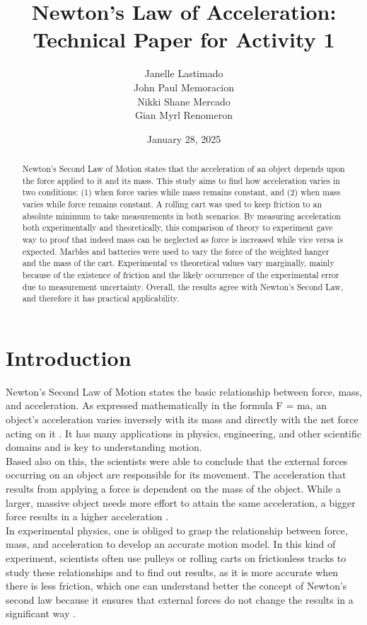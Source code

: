 \documentclass[a4paper,12pt]{article}
\title{Newton's Law of Acceleration: Technical Paper for Activity 1}
\author{Janelle Lastimado \\
John Paul Memoracion \\ 
Nikki Shane Mercado \\
Gian Myrl Renomeron}
\date{January 28, 2025}
\begin{document}
\maketitle

\begin{abstract}
    Newton's Second Law of Motion states that the acceleration of an object depends upon the force applied to it and its mass. This study aims to find how acceleration varies in two conditions: (1) when force varies while mass remains constant, and (2) when mass varies while force remains constant. A rolling cart was used to keep friction to an absolute minimum to take measurements in both scenarios. By measuring acceleration both experimentally and theoretically, this comparison of theory to experiment gave way to proof that indeed mass can be neglected as force is increased while vice versa is expected. Marbles and batteries were used to vary the force of the weighted hanger and the mass of the cart. Experimental vs theoretical values vary marginally, mainly because of the existence of friction and the likely occurrence of the experimental error due to measurement uncertainty. Overall, the results agree with Newton's Second Law, and therefore it has practical applicability.
\end{abstract}

\section{Introduction}
Newton's Second Law of Motion states the basic relationship between force, mass, and acceleration. As expressed mathematically in the formula F = ma, an object's acceleration varies inversely with its mass and directly with the net force acting on it \cite{halliday2021fundamentals}. It has many applications in physics, engineering, and other scientific domains and is key to understanding motion. \\

Based also on this, the scientists were able to conclude that the external forces occurring on an object are responsible for its movement. The acceleration that results from applying a force is dependent on the mass of the object. While a larger, massive object needs more effort to attain the same acceleration, a bigger force results in a higher acceleration \cite{knight2017physics}. \\

In experimental physics, one is obliged to grasp the relationship between force, mass, and acceleration to develop an accurate motion model. In this kind of experiment, scientists often use pulleys or rolling carts on frictionless tracks to study these relationships and to find out results, as it is more accurate when there is less friction, which one can understand better the concept of Newton's second law because it ensures that external forces do not change the results in a significant way \cite{young2020university}. \\
\end{document}
